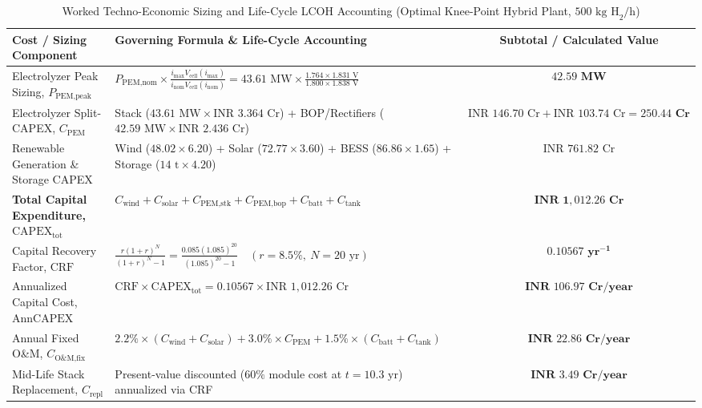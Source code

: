 \documentclass[conference]{IEEEtran}
\begin{document}
\begin{table}[!t]
\caption{Worked Techno-Economic Sizing and Life-Cycle LCOH Accounting (Optimal Knee-Point Hybrid Plant, $500\text{ kg H}_2/\text{h}$)}
\begin{center}
\begin{tabular}{llc}
\toprule
\textbf{Cost / Sizing Component} & \textbf{Governing Formula \& Life-Cycle Accounting} & \textbf{Subtotal / Calculated Value} \\
\midrule
Electrolyzer Peak Sizing, $P_{\text{PEM,peak}}$ & $P_{\text{PEM,nom}} \times \frac{i_{\max} V_{\text{cell}}(i_{\max})}{i_{\text{nom}} V_{\text{cell}}(i_{\text{nom}})} = 43.61\text{ MW} \times \frac{1.764 \times 1.831\text{ V}}{1.800 \times 1.838\text{ V}}$ & $\mathbf{42.59\text{ MW}}$ \\
Electrolyzer Split-CAPEX, $C_{\text{PEM}}$ & Stack ($43.61\text{ MW} \times \text{INR } 3.364\text{ Cr}$) + BOP/Rectifiers ($42.59\text{ MW} \times \text{INR } 2.436\text{ Cr}$) & $\text{INR } 146.70\text{ Cr} + \text{INR } 103.74\text{ Cr} = \mathbf{250.44\text{ Cr}}$ \\
Renewable Generation \& Storage CAPEX & Wind ($48.02 \times 6.20$) + Solar ($72.77 \times 3.60$) + BESS ($86.86 \times 1.65$) + Storage ($14\text{ t} \times 4.20$) & $\text{INR } 761.82\text{ Cr}$ \\
\midrule
\textbf{Total Capital Expenditure, $\text{CAPEX}_{\text{tot}}$} & $C_{\text{wind}} + C_{\text{solar}} + C_{\text{PEM,stk}} + C_{\text{PEM,bop}} + C_{\text{batt}} + C_{\text{tank}}$ & $\mathbf{\text{INR } 1,012.26\text{ Cr}}$ \\
Capital Recovery Factor, $\text{CRF}$ & $\frac{r(1+r)^N}{(1+r)^N - 1} = \frac{0.085(1.085)^{20}}{(1.085)^{20} - 1} \quad (r = 8.5\%,\ N = 20\text{ yr})$ & $\mathbf{0.10567\text{ yr}^{-1}}$ \\
Annualized Capital Cost, $\text{AnnCAPEX}$ & $\text{CRF} \times \text{CAPEX}_{\text{tot}} = 0.10567 \times \text{INR } 1,012.26\text{ Cr}$ & $\mathbf{\text{INR } 106.97\text{ Cr/year}}$ \\
Annual Fixed O\&M, $C_{\text{O\&M,fix}}$ & $2.2\% \times (C_{\text{wind}} + C_{\text{solar}}) + 3.0\% \times C_{\text{PEM}} + 1.5\% \times (C_{\text{batt}} + C_{\text{tank}})$ & $\mathbf{\text{INR } 22.86\text{ Cr/year}}$ \\
Mid-Life Stack Replacement, $C_{\text{repl}}$ & Present-value discounted ($60\%$ module cost at $t=10.3\text{ yr}$) annualized via CRF & $\mathbf{\text{INR } 3.49\text{ Cr/year}}$ \\

\end{tabular}
\end{center}
\end{table}
\end{document}
